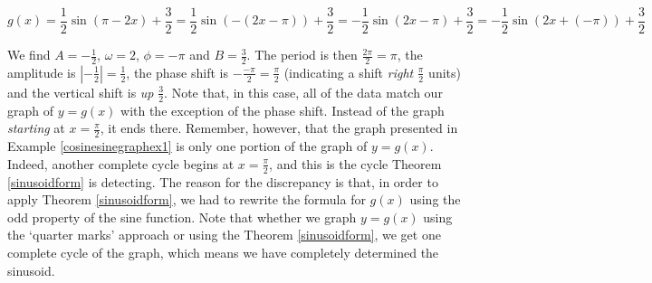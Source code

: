 \vspace{-.1in}

\[ g(x) = \frac{1}{2} \sin(\pi - 2x) + \frac{3}{2} = \frac{1}{2} \sin(-(2x - \pi)) + \frac{3}{2} = -\frac{1}{2} \sin(2x - \pi) + \frac{3}{2}= -\frac{1}{2} \sin(2x + (-\pi)) + \frac{3}{2}\]

\smallskip

We find $A = -\frac{1}{2}$, $\omega = 2$, $\phi = -\pi$ and $B = \frac{3}{2}$.  The period is then $\frac{2\pi}{2} = \pi$, the amplitude is $\left| - \frac{1}{2} \right| = \frac{1}{2}$, the phase shift is $-\frac{-\pi}{2} = \frac{\pi}{2}$ (indicating a shift \textit{right} $\frac{\pi}{2}$ units) and the vertical shift is \textit{up} $\frac{3}{2}$.  Note that, in this case, all of the data match our graph of $y=g(x)$ with the exception of the phase shift.  \label{phaseshiftissue} Instead of the graph \textit{starting} at $x = \frac{\pi}{2}$, it ends there.  Remember, however, that the graph presented in Example \ref{cosinesinegraphex1} is only one portion of the graph of $y=g(x)$.  Indeed, another complete cycle begins at $x = \frac{\pi}{2}$, and this is the cycle Theorem \ref{sinusoidform} is detecting.  The reason for the discrepancy is that, in order to apply  Theorem \ref{sinusoidform}, we had to rewrite the formula for $g(x)$ using the odd property of the sine function.  Note that whether we graph $y=g(x)$ using the `quarter marks' approach or using the Theorem \ref{sinusoidform}, we get one complete cycle of the graph, which means we have completely determined the sinusoid.

